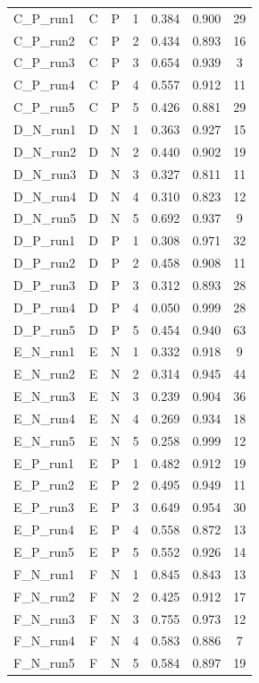 \begin{table}[t]
\begin{tabular}{lcccccc}
C\_P\_run1 & C & P & 1 & 0.384 & 0.900 & 29 \\
C\_P\_run2 & C & P & 2 & 0.434 & 0.893 & 16 \\
C\_P\_run3 & C & P & 3 & 0.654 & 0.939 & 3 \\
C\_P\_run4 & C & P & 4 & 0.557 & 0.912 & 11 \\
C\_P\_run5 & C & P & 5 & 0.426 & 0.881 & 29 \\
D\_N\_run1 & D & N & 1 & 0.363 & 0.927 & 15 \\
D\_N\_run2 & D & N & 2 & 0.440 & 0.902 & 19 \\
D\_N\_run3 & D & N & 3 & 0.327 & 0.811 & 11 \\
D\_N\_run4 & D & N & 4 & 0.310 & 0.823 & 12 \\
D\_N\_run5 & D & N & 5 & 0.692 & 0.937 & 9 \\
D\_P\_run1 & D & P & 1 & 0.308 & 0.971 & 32 \\
D\_P\_run2 & D & P & 2 & 0.458 & 0.908 & 11 \\
D\_P\_run3 & D & P & 3 & 0.312 & 0.893 & 28 \\
D\_P\_run4 & D & P & 4 & 0.050 & 0.999 & 28 \\
D\_P\_run5 & D & P & 5 & 0.454 & 0.940 & 63 \\
E\_N\_run1 & E & N & 1 & 0.332 & 0.918 & 9 \\
E\_N\_run2 & E & N & 2 & 0.314 & 0.945 & 44 \\
E\_N\_run3 & E & N & 3 & 0.239 & 0.904 & 36 \\
E\_N\_run4 & E & N & 4 & 0.269 & 0.934 & 18 \\
E\_N\_run5 & E & N & 5 & 0.258 & 0.999 & 12 \\
E\_P\_run1 & E & P & 1 & 0.482 & 0.912 & 19 \\
E\_P\_run2 & E & P & 2 & 0.495 & 0.949 & 11 \\
E\_P\_run3 & E & P & 3 & 0.649 & 0.954 & 30 \\
E\_P\_run4 & E & P & 4 & 0.558 & 0.872 & 13 \\
E\_P\_run5 & E & P & 5 & 0.552 & 0.926 & 14 \\
F\_N\_run1 & F & N & 1 & 0.845 & 0.843 & 13 \\
F\_N\_run2 & F & N & 2 & 0.425 & 0.912 & 17 \\
F\_N\_run3 & F & N & 3 & 0.755 & 0.973 & 12 \\
F\_N\_run4 & F & N & 4 & 0.583 & 0.886 & 7 \\
F\_N\_run5 & F & N & 5 & 0.584 & 0.897 & 19 \\

\end{tabular}
\end{table}
